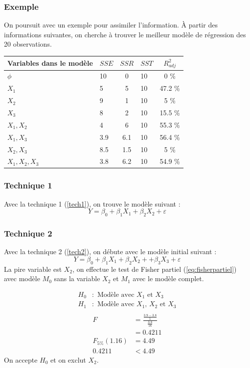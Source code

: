 \documentclass[11pt,french]{report}
\begin{document}
\bigskip
\subsubsection*{Exemple}
On poursuit avec un exemple pour assimiler l'information. \newline
À partir des informations suivantes, on cherche à trouver le meilleur modèle de régression des 20 observations.
\bigskip

\begin{tabularx}{\linewidth}{|X|b|c|b|c|}
\hline
\rowcolor{codegray}
Variables dans le modèle & $SSE$ & $SSR$ & $SST$ & $R^2_{adj}$ \\
\hline
$\phi$ & 10 & 0 & 10 & 0 \% \\
$X_1$ & 5 & 5 & 10 & 47.2 \% \\
$X_2$ & 9 & 1 & 10 & 5 \% \\
$X_3$ & 8 & 2 & 10 & 15.5 \% \\
$X_1, X_2$ & 4 & 6 & 10 & 55.3 \% \\
$X_1, X_3$ & 3.9 & 6.1 & 10 & 56.4 \% \\
$X_2, X_3$ & 8.5 & 1.5 & 10 & 5 \% \\
$X_1, X_2, X_3$ & 3.8 & 6.2 & 10 & 54.9 \% \\
\hline
\end{tabularx}

\subsubsection*{Technique 1}
Avec la technique 1 (\ref{tech1}), on trouve le modèle suivant :
$$
Y = \beta_0 + \beta_1X_1 + \beta_2X_2 + \varepsilon
$$

\subsubsection*{Technique 2}
Avec la technique 2 (\ref{tech2}), on débute avec le modèle initial suivant :
$$
Y = \beta_0 + \beta_1X_1 + \beta_2X_2 + + \beta_3X_3 + \varepsilon
$$
La pire variable est $X_2$, on effectue le test de Fisher partiel (\ref{eq:fisherpartiel}) avec modèle $M_0$ sans la variable $X_2$ et $M_1$ avec le modèle complet. 

\begin{align*}
H_0 &: \text{ Modèle avec $X_1$ et $X_3$} \\
H_1 &: \text{ Modèle avec $X_1$, $X_2$ et $X_3$} \\
\end{align*}
\begin{align*}
F &= \frac{\frac{3.9-3.8}{1}}{\frac{3.8}{16}} \\
&= 0.4211 \\
F_{5 \%}(1.16) &= 4.49 \\
0.4211 &< 4.49
\end{align*}
On accepte $H_0$ et on exclut $X_2$. \newline
\end{document}
